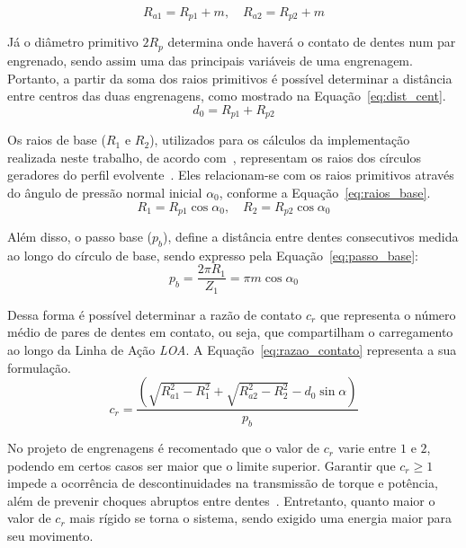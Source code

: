 \begin{equation}
	R_{a1} = R_{p1} + m, \quad R_{a2} = R_{p2} + m
	\label{eq:raios_adendo}
\end{equation}

Já o diâmetro primitivo $2R_p$ determina onde haverá o contato de dentes num par engrenado, sendo assim uma das principais variáveis de uma engrenagem. Portanto, a partir da soma dos raios primitivos é possível determinar a distância entre centros das duas engrenagens, como mostrado na Equação~\ref{eq:dist_cent}.
\begin{equation}
	d_0 = R_{p1} + R_{p2}
	\label{eq:dist_cent}
\end{equation}

Os raios de base ($R_1$ e $R_2$), utilizados para os cálculos da implementação realizada neste trabalho, de acordo com~\cite{yi2019}, representam os raios dos círculos geradores do perfil evolvente~\cite{norton2020}. Eles relacionam-se com os raios primitivos através do ângulo de pressão normal inicial $\alpha_0$, conforme a Equação~\ref{eq:raios_base}.
\begin{equation}
	R_1 = R_{p1} \cos \alpha_0, \quad R_2 = R_{p2} \cos \alpha_0
	\label{eq:raios_base}
\end{equation}

Além disso, o passo base ($p_b$), define a distância entre dentes consecutivos medida ao longo do círculo de base, sendo expresso pela Equação~\ref{eq:passo_base}:
\begin{equation}
	p_b = \frac{2 \pi R_1}{Z_1} = \pi m \cos \alpha_0
	\label{eq:passo_base}
\end{equation}

Dessa forma é possível determinar a razão de contato $c_r$ que representa o número médio de pares de dentes em contato, ou seja, que compartilham o carregamento ao longo da Linha de Ação \textit{LOA}. A Equação~\ref{eq:razao_contato} representa a sua formulação. 
\begin{equation}
	\label{eq:razao_contato}
	c_r = \frac{\left( \sqrt{R_{a1}^2 - R_1^2} + \sqrt{R_{a2}^2 - R_2^2} - d_0 \sin \alpha \right)}{p_b}
\end{equation}

No projeto de engrenagens é recomentado que o valor de $c_r$ varie entre $1$ e $2$, podendo em certos casos ser maior que o limite superior. Garantir que $c_r \ge 1$ impede a ocorrência de descontinuidades na transmissão de torque e potência, além de prevenir choques abruptos entre dentes~\cite{shigley2020}. Entretanto, quanto maior o valor de $c_r$ mais rígido se torna o sistema, sendo exigido uma energia maior para seu movimento. 

